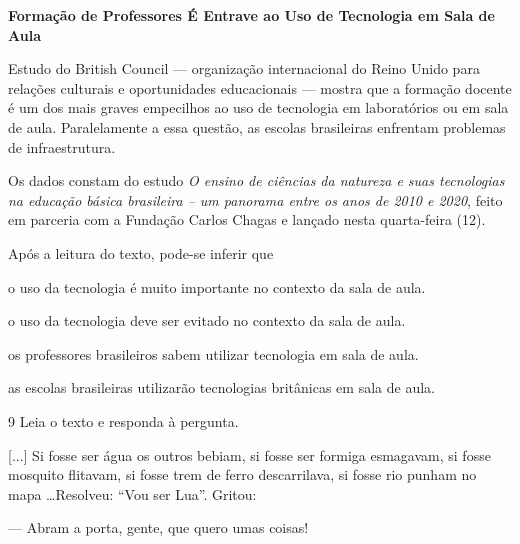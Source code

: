 \begin{myquote}
\textbf{Formação de Professores É Entrave ao Uso de Tecnologia em Sala de
Aula}

Estudo do British Council --- organização internacional do Reino Unido
para relações culturais e oportunidades educacionais --- mostra que a
formação docente é um dos mais graves empecilhos ao uso de tecnologia em
laboratórios ou em sala de aula. Paralelamente a essa questão, as
escolas brasileiras enfrentam problemas de infraestrutura.

Os dados constam do estudo \textit{O ensino de ciências da natureza e suas
tecnologias na educação básica brasileira -- um panorama entre os anos
de 2010 e 2020}, feito em parceria com a Fundação Carlos Chagas e lançado
nesta quarta-feira (12).

\end{myquote}

Após a leitura do texto, pode-se inferir que

\begin{escolha}
  \item o uso da tecnologia é muito importante no contexto da sala de aula.

  \item o uso da tecnologia deve ser evitado no contexto da sala de aula.

  \item os professores brasileiros sabem utilizar tecnologia em sala de aula.

  \item as escolas brasileiras utilizarão tecnologias britânicas em sala de
aula.
\end{escolha}

\num{9} Leia o texto e responda à pergunta.

\begin{myquote}
\textit{ }

[...] Si fosse ser água os outros bebiam, si fosse ser formiga esmagavam, si
fosse mosquito flitavam, si fosse trem de ferro descarrilava, si fosse
rio punham no mapa \ldots Resolveu: ``Vou ser Lua''. Gritou:

--- Abram a porta, gente, que quero umas coisas!

\end{myquote}

